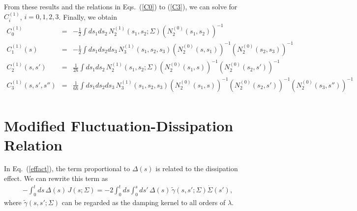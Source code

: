 \documentclass[%
amssymb,preprint,preprintnumbers,nofootinbib,superscriptaddress]{revtex4}
\begin{document}
From these results and the relations in Eqs.~(\ref{C0}) to (\ref{C3}), we can solve for $C_{i}^{(1)}$, $i=0,1,2,3$. Finally, we obtain
\begin{eqnarray}
C_{0}^{(1)}&=&-\frac{1}{2}\int ds_{1}ds_{2}\, N_{2}^{(1)}(s_{1},s_{2};\Sigma)(N_{2}^{(0)}(s_{1},s_{2}))^{-1}\nonumber\\
C_{1}^{(1)}(s)&=&-\frac{1}{2}\int ds_{1}ds_{2}ds_{3}\, N_{3}^{(1)}(s_{1},s_{2},s_{3})(N_{2}^{(0)}(s,s_{1}))^{-1}(N_{2}^{(0)}(s_{2},s_{3}))^{-1}\nonumber\\
C_{2}^{(1)}(s,s')&=&\frac{1}{2\hbar}\int ds_{1}ds_{2}\, N_{2}^{(1)}(s_{1},s_{2};\Sigma)(N_{2}^{(0)}(s_{1},s))^{-1}(N_{2}^{(0)}(s_{2},s'))^{-1}\nonumber\\
C_{3}^{(1)}(s,s',s'')&=&\frac{1}{6\hbar}\int ds_{1}ds_{2}ds_{3}\, N_{3}^{(1)}(s_{1},s_{2},s_{3})(N_{2}^{(0)}(s_{1},s))^{-1}(N_{2}^{(0)}(s_{2},s'))^{-1}(N_{2}^{(0)}(s_{3},s''))^{-1}\nonumber\\
\end{eqnarray}

%
%
%
\section{Modified Fluctuation-Dissipation Relation}\label{sec:FDR}

In Eq.~(\ref{effact}), the term proportional to $\Delta(s)$ is related to the dissipation effect. We can rewrite this term as
\begin{eqnarray}
-\int_{0}^{t}ds\,\Delta(s)\,J(s;\Sigma)=-2\int_{0}^{t}ds\int_{0}^{s}ds'\,\Delta(s)\,\tilde{\gamma}(s,s';\Sigma)\dot{\Sigma}(s'),\label{defdamp}
\end{eqnarray}
where $\tilde{\gamma}(s,s';\Sigma)$ can be regarded as the damping kernel to all orders of $\lambda$. 
\end{document}
